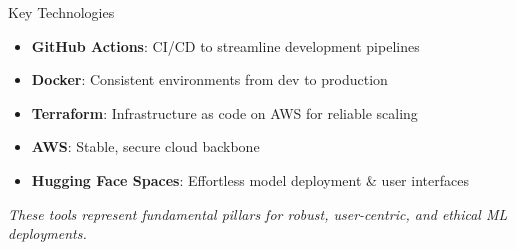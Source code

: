 \documentclass[aspectratio=169]{beamer}
\begin{document}
%
%
%
%
%
%
\begin{frame}{Key Technologies}
\begin{itemize}
\item \textbf{GitHub Actions}: CI/CD to streamline development pipelines
\item \textbf{Docker}: Consistent environments from dev to production
\item \textbf{Terraform}: Infrastructure as code on AWS for reliable scaling
\item \textbf{AWS}: Stable, secure cloud backbone
\item \textbf{Hugging Face Spaces}: Effortless model deployment \& user interfaces
\end{itemize}

\vspace{0.8em}
\emph{These tools represent fundamental pillars for robust, user-centric, and ethical ML deployments.}
\end{frame}
\end{document}
